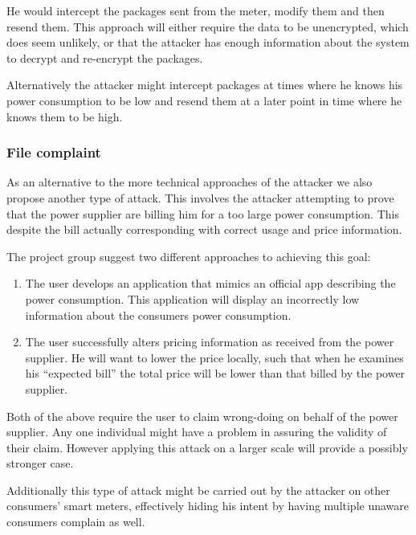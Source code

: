 He would intercept the packages sent from the meter, modify them and then resend them.
This approach will either require the data to be unencrypted, which does seem unlikely, or that the attacker has enough information about the system to decrypt and re-encrypt the packages.

Alternatively the attacker might intercept packages at times where he knows his power consumption to be low and resend them at a later point in time where he knows them to be high.

\subsubsection{File complaint}
As an alternative to the more technical approaches of the attacker we also propose another type of attack.
This involves the attacker attempting to prove that the power supplier are billing him for a too large power consumption.
This despite the bill actually corresponding with correct usage and price information.

The project group suggest two different approaches to achieving this goal:
\begin{enumerate}
  \item The user develops an application that mimics an official app describing the power consumption.
  This application will display an incorrectly low information about the consumers power consumption.
  \item The user successfully alters pricing information as received from the power supplier.
  He will want to lower the price locally, such that when he examines his ``expected bill'' the total price will be lower than that billed by the power supplier.
\end{enumerate}
Both of the above require the user to claim wrong-doing on behalf of the power supplier.
Any one individual might have a problem in assuring the validity of their claim.
However applying this attack on a larger scale will provide a possibly stronger case.

Additionally this type of attack might be carried out by the attacker on other consumers' smart meters, effectively hiding his intent by having multiple unaware consumers complain as well.
